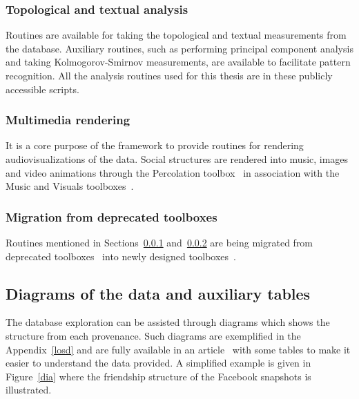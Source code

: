 \subsubsection{Topological and textual analysis}\label{ana}
Routines are available for taking the topological and textual measurements from
the database.
Auxiliary routines, such as performing principal component analysis
and taking Kolmogorov-Smirnov measurements, are available
to facilitate pattern recognition.
All the analysis routines used for this thesis are in these publicly accessible scripts.

\subsubsection{Multimedia rendering}\label{media}
It is a core purpose of the framework to provide routines for rendering
audiovisualizations of the data.
Social structures are rendered into music, images and video animations
through the Percolation toolbox~\cite{percolation} in association with
the Music and Visuals toolboxes~\cite{music,visuals}.

\subsubsection{Migration from deprecated toolboxes}
Routines mentioned in Sections~\ref{ana} and~\ref{media} are being migrated from deprecated
toolboxes~\cite{gmaneLegacy,percolationLegacy} into newly designed
toolboxes~\cite{percolation,visuals}.

\subsection{Diagrams of the data and auxiliary tables}
The database exploration can be assisted through diagrams which shows
the structure from each provenance.
Such diagrams are exemplified in the Appendix~\ref{losd} and 
are fully available in an article~\cite{losd}
with some tables to make it easier to understand the data provided.
A simplified example is given in Figure~\ref{dia} where the friendship
structure of the Facebook snapshots is illustrated.

